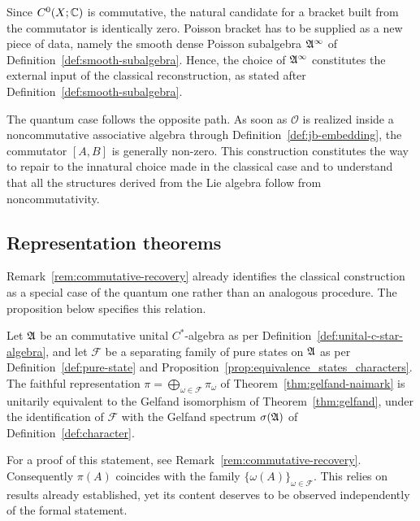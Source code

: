 	\begin{remark}
		\label{rem:concl-bracket-comparison}
		Since $C^0(X;\mathbb{C})$ is commutative, the natural candidate for a bracket built from the commutator is identically zero. Poisson bracket has to be supplied as a new piece of data, namely the smooth dense Poisson subalgebra $\mathfrak{A}^\infty$ of Definition~\ref{def:smooth-subalgebra}. Hence, the choice of $\mathfrak{A}^\infty$ constitutes the external input of the classical reconstruction, as stated after Definition~\ref{def:smooth-subalgebra}.
		
		The quantum case follows the opposite path. As soon as $\mathcal{O}$ is realized inside a noncommutative associative algebra through Definition~\ref{def:jb-embedding}, the commutator $[A,B]$ is generally non-zero. This construction constitutes the way to repair to the innatural choice made in the classical case and to understand that all the structures derived from the Lie algebra follow from noncommutativity.
	\end{remark}
	
	\subsection*{Representation theorems}
	
	 Remark~\ref{rem:commutative-recovery} already identifies the classical construction as a special case of the quantum one rather than an analogous procedure. The proposition below specifies this relation.
	
	\begin{proposition}
		\label{prop:concl-gelfand-corollary}
		Let $\mathfrak{A}$ be an commutative unital $C^*$-algebra as per Definition~\ref{def:unital-c-star-algebra}, and let $\mathcal F$ be a separating family of pure states on $\mathfrak{A}$ as per Definition~\ref{def:pure-state} and Proposition~\ref{prop:equivalence_states_characters}. The faithful representation $\pi=\bigoplus_{\omega\in\mathcal F}\pi_\omega$ of Theorem~\ref{thm:gelfand-naimark} is unitarily equivalent to the Gelfand isomorphism of Theorem~\ref{thm:gelfand}, under the identification of $\mathcal F$ with the Gelfand spectrum $\sigma(\mathfrak{A})$ of Definition~\ref{def:character}.
	\end{proposition}
	
	For a proof of this statement, see Remark~\ref{rem:commutative-recovery}. Consequently $\pi(A)$ coincides with the family $\{\omega(A)\}_{\omega\in\mathcal F}$. This relies on results already established, yet its content deserves to be observed independently of the formal statement.
	
